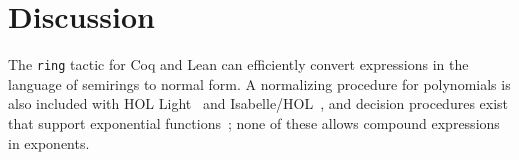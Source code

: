 \documentclass{llncs}
\newcommand{\lean}[1]{\texttt{#1}\xspace} %
\newcommand{\mathlib}{\texttt{mathlib}\xspace}
\newcommand{\ring}{\lean{ring}}
\newcommand{\ringexp}{\lean{ring\_exp}}
\begin{document}
% 

%
%


\section{Discussion}

The \ring tactic for Coq and Lean can efficiently convert expressions in the language of semirings to normal form.
A normalizing procedure for polynomials is also included with HOL Light~\cite{hol_light} and Isabelle/HOL~\cite{isabelle_hol},
and decision procedures exist that support exponential functions~\cite{resolution-rcf};
none of these allows compound expressions in exponents.
\end{document}
